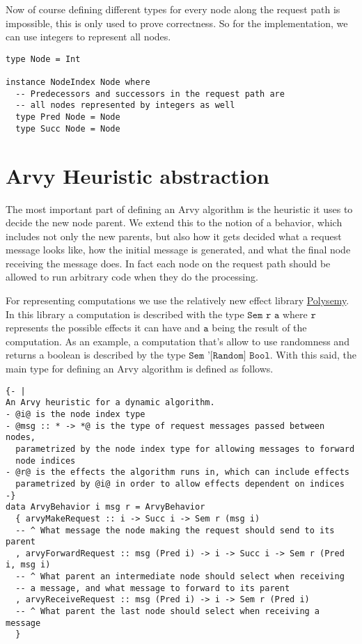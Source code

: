 \documentclass[a4paper, oneside]{discothesis}
\begin{document}
Now of course defining different types for every node along the request path is impossible, this is only used to prove correctness. So for the implementation, we can use integers to represent all nodes.

\begin{verbatim}
type Node = Int

instance NodeIndex Node where
  -- Predecessors and successors in the request path are
  -- all nodes represented by integers as well
  type Pred Node = Node
  type Succ Node = Node
\end{verbatim}

\section{Arvy Heuristic abstraction}

The most important part of defining an Arvy algorithm is the heuristic it uses to decide the new node parent. We extend this to the notion of a behavior, which includes not only the new parents, but also how it gets decided what a request message looks like, how the initial message is generated, and what the final node receiving the message does. In fact each node on the request path should be allowed to run arbitrary code when they do the processing.

For representing computations we use the relatively new effect library \href{https://hackage.haskell.org/package/polysemy}{Polysemy}. In this library a computation is described with the type $\texttt{Sem r a}$ where $\texttt{r}$ represents the possible effects it can have and $\texttt{a}$ being the result of the computation. As an example, a computation that's allow to use randomness and returns a boolean is described by the type $\texttt{Sem '[Random] Bool}$. With this said, the main type for defining an Arvy algorithm is defined as follows.

\begin{verbatim}
{- |
An Arvy heuristic for a dynamic algorithm.
- @i@ is the node index type
- @msg :: * -> *@ is the type of request messages passed between nodes,
  parametrized by the node index type for allowing messages to forward
  node indices
- @r@ is the effects the algorithm runs in, which can include effects
  parametrized by @i@ in order to allow effects dependent on indices
-}
data ArvyBehavior i msg r = ArvyBehavior
  { arvyMakeRequest :: i -> Succ i -> Sem r (msg i)
  -- ^ What message the node making the request should send to its parent
  , arvyForwardRequest :: msg (Pred i) -> i -> Succ i -> Sem r (Pred i, msg i)
  -- ^ What parent an intermediate node should select when receiving
  -- a message, and what message to forward to its parent
  , arvyReceiveRequest :: msg (Pred i) -> i -> Sem r (Pred i)
  -- ^ What parent the last node should select when receiving a message
  }
\end{verbatim}
\end{document}
